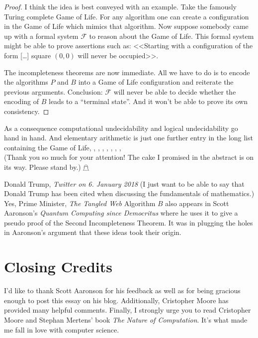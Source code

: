 \documentclass{article}
\theoremstyle{customstyle}
\newcommand{\F}{\ensuremath{\mathcal{F}}}
\begin{document}
\begin{proof}\vspace{-\topsep}
I think the idea is best conveyed with an example. Take the famously Turing complete Game of Life. For any algorithm one can create a configuration in the Game of Life which mimics that algorithm. Now suppose somebody came up with a formal system $\F$ to reason about the Game of Life. This formal system might be able to prove assertions such as: <<Starting with a configuration of the form [\dots] square $(0, 0)$ will never be occupied>>.

The incompleteness theorems are now immediate. All we have to do is to encode the algorithms $P$ and $B$ into a Game of Life configuration and reiterate the previous arguments. Conclusion: $\F$ will never be able to decide whether the encoding of $B$ leads to a ``terminal state''. And it won't be able to prove its own consistency.
\end{proof}

As a consequence computational undecidability and logical undecidability go hand in hand. And elementary arithmetic is just one further entry in the long list containing the Game of Life, \scalebox{0.95}{Fractran}, \scalebox{0.9}{Post Tag Systems}, \scalebox{0.85}{Magic the Gathering}, \scalebox{0.8}{the human brain}, \scalebox{0.75}{Rule 110}, \scalebox{0.7}{the Lambda Calculus}, \scalebox{0.65}{musical notation}, \scalebox{0.6}{\dots}\\[2em]
\footnotesize{(Thank you so much for your attention! The cake I promised in the abstract is on its way. Please stand by.) $\mathghost$}

\begin{thebibliography}{1}
Donald Trump, \textit{Twitter on 6. January 2018} (I just want to be able to say that Donald Trump has been cited when discussing the fundamentals of mathematics.)
Yes, Prime Minister, \textit{The Tangled Web}
 Algorithm $B$ also appears in Scott Aaronson's \textit{Quantum Computing since Democritus} where he uses it to give a pseudo proof of the Second Incompleteness Theorem. It was in plugging the holes in Aaronson's argument that these ideas took their origin.
\end{thebibliography}

\section*{Closing Credits}

I'd like to thank Scott Aaronson for his feedback as well as for being gracious enough to post this essay on his blog. Additionally, Cristopher Moore has provided many helpful comments. Finally, I strongly urge you to read Cristopher Moore and Stephan Mertens' book \textit{The Nature of Computation}. It's what made me fall in love with computer science.

\vfill\eject
\end{document}
